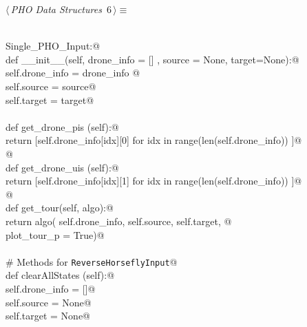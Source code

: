 \documentclass[12.0pt]{report}
\begin{document}
\begin{flushleft} \small\label{scrap1}\raggedright\small
{} $\langle\,${\itshape PHO Data Structures}\nobreak\ {\footnotesize {6}}$\,\rangle\equiv$
\vspace{-1ex}
\begin{list}{}{} \item
\mbox{}\verb@@\\
\mbox{}\verb@class Single_PHO_Input:@\\
\mbox{}\verb@    def __init__(self, drone_info = [] , source = None, target=None):@\\
\mbox{}\verb@           self.drone_info = drone_info @\\
\mbox{}\verb@           self.source     = source@\\
\mbox{}\verb@           self.target     = target@\\
\mbox{}\verb@@\\
\mbox{}\verb@    def get_drone_pis (self):@\\
\mbox{}\verb@           return [self.drone_info[idx][0] for idx in range(len(self.drone_info)) ]@\\
\mbox{}\verb@           @\\
\mbox{}\verb@    def get_drone_uis (self):@\\
\mbox{}\verb@           return [self.drone_info[idx][1] for idx in range(len(self.drone_info)) ]@\\
\mbox{}\verb@         @\\
\mbox{}\verb@    def get_tour(self, algo):@\\
\mbox{}\verb@           return algo( self.drone_info, self.source, self.target, @\\
\mbox{}\verb@                        plot_tour_p = True)@\\
\mbox{}\verb@@\\
\mbox{}\verb@    # Methods for \verb|ReverseHorseflyInput|@\\
\mbox{}\verb@    def clearAllStates (self):@\\
\mbox{}\verb@          self.drone_info = []@\\
\mbox{}\verb@          self.source = None@\\
\mbox{}\verb@          self.target = None@\\
\mbox{}\verb@@\\
\mbox{}\verb@@\\
\mbox{}\verb@@\\
\mbox{}\verb@@\\

\end{list}
\end{flushleft}
\end{document}
